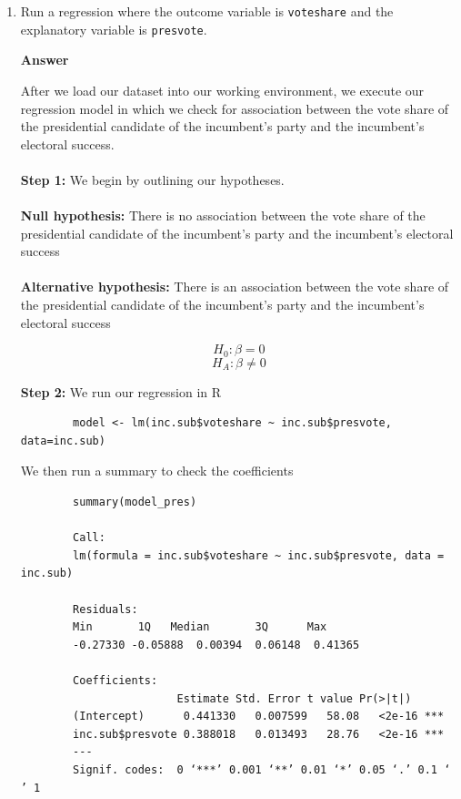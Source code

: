 \documentclass[12pt,letterpaper]{article}
\begin{document}
	\begin{enumerate}
		\item Run a regression where the outcome variable is \texttt{voteshare} and the explanatory variable is \texttt{presvote}. \\
	
\noindent 

	\textbf{Answer}
	
	After we load our dataset into our working environment, we execute our regression
	model in which we check for association between the vote share of the presidential candidate of the incumbent's party and the incumbent's electoral success. \\
	\\
	
	\textbf{Step 1:} We begin by outlining our hypotheses. \\
	\\
	
	\textbf{Null hypothesis: }
	There is no association between the vote share of the presidential candidate of the incumbent’s party and the incumbent’s electoral success \\
	\\
	
	\textbf{Alternative hypothesis: }
	There is an association between the vote share of the presidential candidate of the incumbent’s party and the incumbent’s electoral success
	
	$$H_0: \beta = 0$$
	$$H_A: \beta \neq 0$$
	
	\vspace{.25cm}
	
	
	\textbf{Step 2:} We run our regression in R

	
	\begin{verbatim}
		model <- lm(inc.sub$voteshare ~ inc.sub$presvote, data=inc.sub)		
	\end{verbatim}
	
	We then run a summary to check the coefficients
	
	\begin{verbatim}
		summary(model_pres)
		
		Call:
		lm(formula = inc.sub$voteshare ~ inc.sub$presvote, data = inc.sub)
		
		Residuals:
		Min       1Q   Median       3Q      Max 
		-0.27330 -0.05888  0.00394  0.06148  0.41365 
		
		Coefficients:
		                Estimate Std. Error t value Pr(>|t|)    
		(Intercept)      0.441330   0.007599   58.08   <2e-16 ***
		inc.sub$presvote 0.388018   0.013493   28.76   <2e-16 ***
		---
		Signif. codes:  0 ‘***’ 0.001 ‘**’ 0.01 ‘*’ 0.05 ‘.’ 0.1 ‘ ’ 1
		

\end{verbatim}
\end{enumerate}
\end{document}
